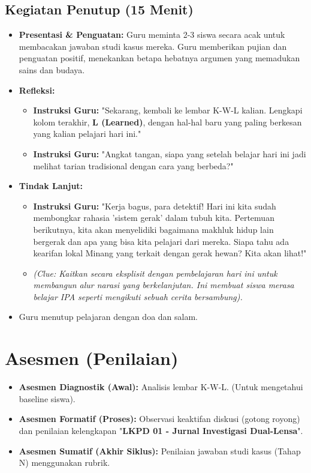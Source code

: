 \documentclass[a4paper,12pt]{article}
\begin{document}
\subsection{Kegiatan Penutup (15 Menit)}
\begin{itemize}
\item \textbf{Presentasi \& Penguatan:} Guru meminta 2-3 siswa secara acak untuk membacakan jawaban studi kasus mereka. Guru memberikan pujian dan penguatan positif, menekankan betapa hebatnya argumen yang memadukan sains dan budaya.
\item \textbf{Refleksi:}
    \begin{itemize}
    \item \textbf{Instruksi Guru:} "Sekarang, kembali ke lembar K-W-L kalian. Lengkapi kolom terakhir, \textbf{L (Learned)}, dengan hal-hal baru yang paling berkesan yang kalian pelajari hari ini."
    \item \textbf{Instruksi Guru:} "Angkat tangan, siapa yang setelah belajar hari ini jadi melihat tarian tradisional dengan cara yang berbeda?"
    \end{itemize}
\item \textbf{Tindak Lanjut:}
    \begin{itemize}
    \item \textbf{Instruksi Guru:} "Kerja bagus, para detektif! Hari ini kita sudah membongkar rahasia 'sistem gerak' dalam tubuh kita. Pertemuan berikutnya, kita akan menyelidiki bagaimana makhluk hidup lain bergerak dan apa yang bisa kita pelajari dari mereka. Siapa tahu ada kearifan lokal Minang yang terkait dengan gerak hewan? Kita akan lihat!"
    \item \textit{(Clue: Kaitkan secara eksplisit dengan pembelajaran hari ini untuk membangun alur narasi yang berkelanjutan. Ini membuat siswa merasa belajar IPA seperti mengikuti sebuah cerita bersambung).}
    \end{itemize}
\item Guru menutup pelajaran dengan doa dan salam.
\end{itemize}

\section{Asesmen (Penilaian)}

\begin{itemize}
\item \textbf{Asesmen Diagnostik (Awal):} Analisis lembar K-W-L. (Untuk mengetahui baseline siswa).
\item \textbf{Asesmen Formatif (Proses):} Observasi keaktifan diskusi (gotong royong) dan penilaian kelengkapan "\textbf{LKPD 01 - Jurnal Investigasi Dual-Lensa}".
\item \textbf{Asesmen Sumatif (Akhir Siklus):} Penilaian jawaban studi kasus (Tahap N) menggunakan rubrik.
\end{itemize}
\end{document}
